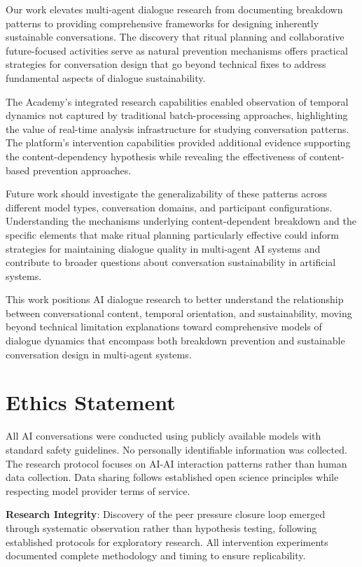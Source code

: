\documentclass[11pt,letterpaper]{article}
\newcommand{\theacademy}{The Academy}
\begin{document}
Our work elevates multi-agent dialogue research from documenting breakdown patterns to providing comprehensive frameworks for designing inherently sustainable conversations. The discovery that ritual planning and collaborative future-focused activities serve as natural prevention mechanisms offers practical strategies for conversation design that go beyond technical fixes to address fundamental aspects of dialogue sustainability.

\theacademy{}'s integrated research capabilities enabled observation of temporal dynamics not captured by traditional batch-processing approaches, highlighting the value of real-time analysis infrastructure for studying conversation patterns. The platform's intervention capabilities provided additional evidence supporting the content-dependency hypothesis while revealing the effectiveness of content-based prevention approaches.

Future work should investigate the generalizability of these patterns across different model types, conversation domains, and participant configurations. Understanding the mechanisms underlying content-dependent breakdown and the specific elements that make ritual planning particularly effective could inform strategies for maintaining dialogue quality in multi-agent AI systems and contribute to broader questions about conversation sustainability in artificial systems.

This work positions AI dialogue research to better understand the relationship between conversational content, temporal orientation, and sustainability, moving beyond technical limitation explanations toward comprehensive models of dialogue dynamics that encompass both breakdown prevention and sustainable conversation design in multi-agent systems.

\section*{Ethics Statement}

All AI conversations were conducted using publicly available models with standard safety guidelines. No personally identifiable information was collected. The research protocol focuses on AI-AI interaction patterns rather than human data collection. Data sharing follows established open science principles while respecting model provider terms of service.

\textbf{Research Integrity}: Discovery of the peer pressure closure loop emerged through systematic observation rather than hypothesis testing, following established protocols for exploratory research. All intervention experiments documented complete methodology and timing to ensure replicability.
\end{document}

